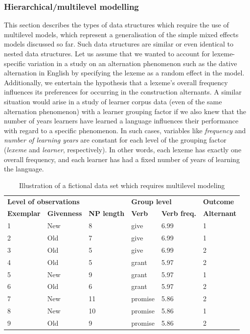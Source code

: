 \subsubsection{Hierarchical\slash multilevel modelling}
\label{sec:hierarchicalormultilevelmodels}

This section describes the types of data structures which require the use of multilevel models, which represent a generalisation of the simple mixed effects models discussed so far.
Such data structures are similar or even identical to nested data structures.
Let us assume that we wanted to account for lexeme-specific variation in a study on an alternation phenomenon such as the dative alternation in English by specifying the lexeme as a random effect in the model.
Additionally, we entertain the hypothesis that a lexeme's overall frequency influences its preferences for occurring in the construction alternants.
A similar situation would arise in a study of learner corpus data (even of the same alternation phenomenon) with a learner grouping factor if we also knew that the number of years learners have learned a language influences their performance with regard to a specific phenomenon.
In such cases, variables like \textit{frequency} and \textit{number of learning years} are constant for each level of the grouping factor (\textit{lexeme} and \textit{learner}, respectively).
In other words, each lexeme has exactly one overall frequency, and each learner has had a fixed number of years of learning the language.

\begin{table}
  \centering
  \begin{tabular}{llllll}
    \toprule
    \multicolumn{3}{l}{\textbf{Level of observations}}          & \multicolumn{2}{l}{\textbf{Group level}}  & \textbf{Outcome} \\
    \textbf{Exemplar} & \textbf{Givenness} & \textbf{NP length} & \textbf{Verb} & \textbf{Verb freq.}       & \textbf{Alternant}\\
    \midrule
            1 &     New   &      8    &    give   &   6.99   & 1 \\
            2 &     Old   &      7    &    give   &   6.99   & 1 \\
            3 &     Old   &      5    &    give   &   6.99   & 2 \\
            4 &     Old   &      5    &    grant  &   5.97   & 2 \\
            5 &     New   &      9    &    grant  &   5.97   & 1 \\
            6 &     Old   &      6    &    grant  &   5.97   & 2 \\
            7 &     New   &      11   &   promise &   5.86   & 2 \\
            8 &     New   &      10   &   promise &   5.86   & 1 \\
            9 &     Old   &      9    &   promise &   5.86   & 2 \\
    \bottomrule
  \end{tabular}
  \caption{Illustration of a fictional data set which requires multilevel modeling}
  \label{tab:multilevel}
\end{table}

